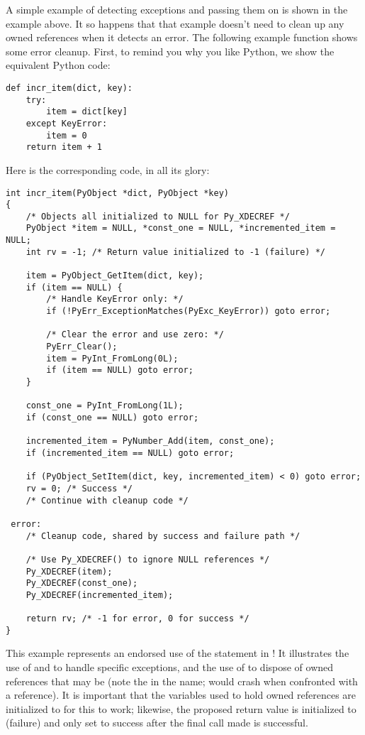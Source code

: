 \documentclass{manual}
\begin{document}
A simple example of detecting exceptions and passing them on is shown 
in the  example above.  It so happens that
that example doesn't need to clean up any owned references when it
detects an error.  The following example function shows some error
cleanup.  First, to remind you why you like Python, we show the
equivalent Python code:

\begin{verbatim}
def incr_item(dict, key):
    try:
        item = dict[key]
    except KeyError:
        item = 0
    return item + 1
\end{verbatim}

Here is the corresponding \C{} code, in all its glory:

\begin{verbatim}
int incr_item(PyObject *dict, PyObject *key)
{
    /* Objects all initialized to NULL for Py_XDECREF */
    PyObject *item = NULL, *const_one = NULL, *incremented_item = NULL;
    int rv = -1; /* Return value initialized to -1 (failure) */

    item = PyObject_GetItem(dict, key);
    if (item == NULL) {
        /* Handle KeyError only: */
        if (!PyErr_ExceptionMatches(PyExc_KeyError)) goto error;

        /* Clear the error and use zero: */
        PyErr_Clear();
        item = PyInt_FromLong(0L);
        if (item == NULL) goto error;
    }

    const_one = PyInt_FromLong(1L);
    if (const_one == NULL) goto error;

    incremented_item = PyNumber_Add(item, const_one);
    if (incremented_item == NULL) goto error;

    if (PyObject_SetItem(dict, key, incremented_item) < 0) goto error;
    rv = 0; /* Success */
    /* Continue with cleanup code */

 error:
    /* Cleanup code, shared by success and failure path */

    /* Use Py_XDECREF() to ignore NULL references */
    Py_XDECREF(item);
    Py_XDECREF(const_one);
    Py_XDECREF(incremented_item);

    return rv; /* -1 for error, 0 for success */
}
\end{verbatim}

This example represents an endorsed use of the  statement 
in \C{}!  It illustrates the use of
 and  to
handle specific exceptions, and the use of  to
dispose of owned references that may be \NULL{} (note the  in
the name;  would crash when confronted with a
\NULL{} reference).  It is important that the variables used to hold
owned references are initialized to \NULL{} for this to work;
likewise, the proposed return value is initialized to 
(failure) and only set to success after the final call made is
successful.
\end{document}
